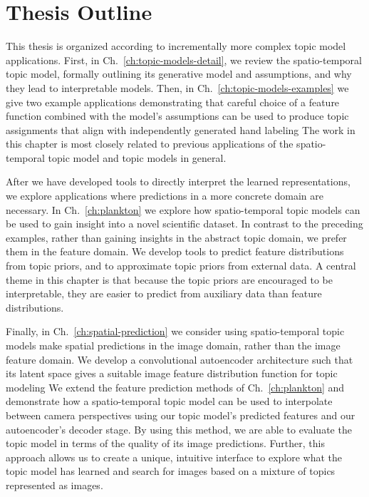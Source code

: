\section{Thesis Outline} \label{sec:intro-outline}
This thesis is organized according to incrementally more complex topic model applications. First, in Ch.~\ref{ch:topic-models-detail}, we review the spatio-temporal topic model, formally outlining its generative model and assumptions, and why they lead to interpretable models. Then, in Ch.~\ref{ch:topic-models-examples} we give two example applications demonstrating that careful choice of a feature function combined with the model's assumptions can be used to produce topic assignments that align with independently generated hand labeling The work in this chapter is most closely related to previous applications of the spatio-temporal topic model and topic models in general.

After we have developed tools to directly interpret the learned representations, we explore applications where predictions in a more concrete domain are necessary. In Ch.~\ref{ch:plankton} we explore how spatio-temporal topic models can be used to gain insight into a novel scientific dataset. In contrast to the preceding examples, rather than gaining insights in the abstract topic domain, we prefer them in the feature domain. We develop tools to predict feature distributions from topic priors, and to approximate topic priors from external data. A central theme in this chapter is that because the topic priors are encouraged to be interpretable, they are easier to predict from auxiliary data than feature distributions.

Finally, in Ch.~\ref{ch:spatial-prediction} we consider using spatio-temporal topic models make spatial predictions in the image domain, rather than the image feature domain. We develop a convolutional autoencoder architecture such that its latent space gives a suitable image feature distribution function for topic modeling We extend the feature prediction methods of Ch.~\ref{ch:plankton} and demonstrate how a spatio-temporal topic model can be used to interpolate between camera perspectives using our topic model's predicted features and our autoencoder's decoder stage. By using this method, we are able to evaluate the topic model in terms of the quality of its image predictions. Further, this approach allows us to create a unique, intuitive interface to explore what the topic model has learned and search for images based on a mixture of topics represented as images.
